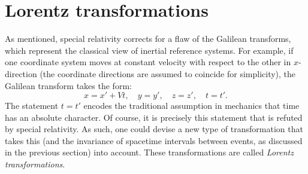 \section{Lorentz transformations}
\label{sec:lorentz_transformations}
As mentioned, special relativity corrects for a flaw of the Galilean transforms, which represent the classical view of inertial reference systems. For example, if one coordinate system moves at constant velocity  with respect to the other in \(x\)-direction (the coordinate directions are assumed to coincide for simplicity), the Galilean transform takes the form:
\begin{equation}
    x = x' + Vt, \quad y = y', \quad z = z',\quad t = t'.
    \label{eq:galilean_transform}
\end{equation}
The statement \(t = t'\) encodes the traditional assumption in mechanics that time has an absolute character. Of course, it is precisely this statement that is refuted by special relativity. As such, one could devise a new type of transformation that takes this (and the invariance of spacetime intervals between events, as discussed in the previous section) into account. These transformations are called \emph{Lorentz transformations}. 

